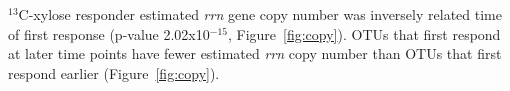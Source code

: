 $^{13}$C-xylose responder estimated \textit{rrn} gene copy number was
inversely related time of first response (p-value 2.02x10$^{-15}$,
Figure~\ref{fig:copy}). OTUs that first respond at later time points have
fewer estimated \textit{rrn} copy number than OTUs that first respond
earlier (Figure~\ref{fig:copy}). 





